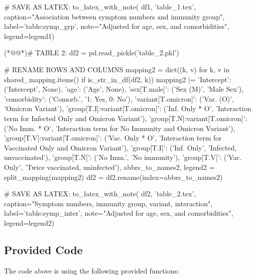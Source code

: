 \documentclass[11pt]{article}
\begin{document}
\begin{python}
# SAVE AS LATEX:
to_latex_with_note(
    df1, 'table_1.tex',
    caption="Association between symptom numbers and immunity group", 
    label='table:symp_grp',
    note="Adjusted for age, sex, and comorbidities",
    legend=legend1)

(*@@*)# TABLE 2:
df2 = pd.read_pickle('table_2.pkl')

# RENAME ROWS AND COLUMNS 
mapping2 = dict((k, v) for k, v in shared_mapping.items() if is_str_in_df(df2, k)) 
mapping2 |= {
    'Intercept': ('Intercept', None),
    'age': ('Age', None),
    'sex[T.male]': ('Sex (M)', 'Male Sex'),
    'comorbidity': ('Comorb.', '1: Yes, 0: No'),
    'variant[T.omicron]': ('Var. (O)', 'Omicron Variant'),
    'group[T.I]:variant[T.omicron]': ('Inf. Only * O', 'Interaction term for Infected Only and Omicron Variant'),
    'group[T.N]:variant[T.omicron]': ('No Imm. * O', 'Interaction term for No Immunity and Omicron Variant'),
    'group[T.V]:variant[T.omicron]': ('Vac. Only * O', 'Interaction term for Vaccinated Only and Omicron Variant'),
    'group[T.I]': ('Inf. Only', 'Infected, unvaccinated'),
    'group[T.N]': ('No Imm.', 'No immunity'),
    'group[T.V]': ('Vac. Only', 'Twice vaccinated, uninfected'),
}
abbrs_to_names2, legend2 = split_mapping(mapping2)
df2 = df2.rename(index=abbrs_to_names2)

# SAVE AS LATEX:
to_latex_with_note(
    df2, 'table_2.tex',
    caption="Symptom numbers, immunity group, variant, interaction", 
    label='table:symp_inter',
    note="Adjusted for age, sex, and comorbidities",
    legend=legend2)

\end{python}

\subsection{Provided Code}
The code above is using the following provided functions:
\end{document}
